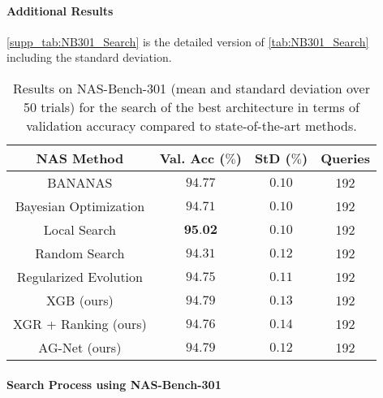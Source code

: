 \documentclass[runningheads]{llncs}
\begin{document}
\paragraph{Additional Results}
\autoref{supp_tab:NB301_Search} is the detailed version of \autoref{tab:NB301_Search} including the standard deviation.
\begin{table}[ht]
	\caption{Results on NAS-Bench-301 (mean and standard deviation over 50 trials) for the search of the best architecture in terms of validation accuracy compared to state-of-the-art methods.}
	\label{supp_tab:NB301_Search}
	\scriptsize
	\begin{center}
		\begin{tabular}{c||c| c || c}
			\toprule
			\textbf{NAS Method}  & \textbf{Val. Acc} ($\%$) & \textbf{StD} ($\%$) & \textbf{Queries} \\
			\midrule
			BANANAS\textsuperscript{\textdagger} \cite{2021BANANAS} & $94.77$  & $0.10$  & 192 \\
			Bayesian Optimization\textsuperscript{\textdagger}  \cite{2015DNGO}  & $94.71$ & $0.10$ & 192  \\
			Local Search\textsuperscript{\textdagger} \cite{2020LocalSearchNAS} & $\textbf{95.02}$ & $0.10$ & 192\\
			Random Search\textsuperscript{\textdagger}\cite{2019RS}  & $94.31$ & $0.12$ & 192 \\
			Regularized Evolution\textsuperscript{{\textdagger}}\cite{2019EvolutionaryNAS}  & $94.75$ &  $0.11$& 192 \\
			\midrule
			XGB (ours) & $94.79$ & $0.13$ & 192 \\
			XGR + Ranking (ours) & $94.76$ & $0.14$& 192 \\
			\midrule
			AG-Net (ours)  & $94.79$ & $0.12$ & 192
			\\
			\bottomrule
		\end{tabular}
	\end{center}
\end{table}

\label{sec:darts}
\paragraph{Search Process using NAS-Bench-301}
\end{document}
